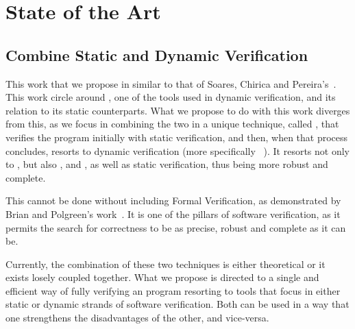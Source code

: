 
%

\makeatletter
\newcommand{\ntifpkgloaded}{%
  \@ifpackageloaded%
}
\makeatother


\chapter{State of the Art}
\label{cha:state_of_the_art}


\section{Combine Static and Dynamic Verification}
\label{sec:combine_static_and_dynamic_verification}

This work that we propose in similar to that of Soares, Chirica and Pereira's~\cite{Soares_Chirica_Pereira2024}. 
  This work circle around \gospellang, one of the tools used in 
dynamic verification, and its relation to its static counterparts. What we propose to do with this work 
diverges from this, as we focus in combining the two in a unique technique, called \monitors, that 
verifies the program initially with static verification, and then, when that process concludes, resorts to 
dynamic verification (more specifically \rac~\cite{Soares_Chirica_Pereira2024}). It resorts not only to 
\gospellang, but also \ortac, \why and \cameleer, as well as static verification, thus being more robust and 
complete.

This cannot be done without including Formal Verification, as demonstrated by Brian and Polgreen's 
work~\cite{Brian_Polgreen2025}. It is one of the pillars of software verification, as it permits the search for correctness 
to be as precise, robust and complete as it can be.

Currently, the combination of these two techniques is either theoretical or it exists losely coupled together. 
What we propose is directed to a single and efficient way of fully verifying an \ocaml program resorting to 
tools that focus in either static or dynamic strands of software verification. Both can be used in a way that 
one strengthens the disadvantages of the other, and vice-versa.